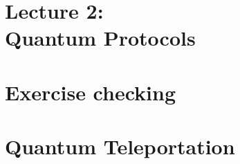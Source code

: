 \section{Lecture 2: \\ Quantum Protocols}
\SectionPage{}



\section{Exercise checking}
\SectionPage{}



\section{Quantum Teleportation}
\SectionPage{}








